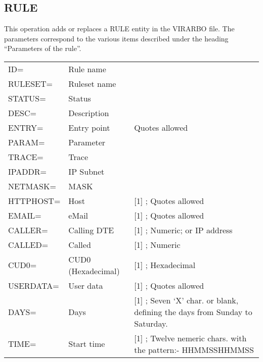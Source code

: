 \documentclass[letterpaper,10pt,english]{sphinxmanual}
\begin{document}

\subsection{RULE}
\label{\detokenize{Installation_Guide:index-169}}\label{\detokenize{Installation_Guide:rule}}
This operation adds or replaces a RULE entity in the VIRARBO file. The parameters correspond to the various items described under the heading “Parameters of the rule”.


\begin{savenotes}\sphinxattablestart
\centering
\begin{tabulary}{\linewidth}[t]{|T|T|T|}
\hline
{}\relax &\relax &\relax \\
\hline
ID=
&
Rule name
&\\
\hline
RULESET=
&
Ruleset name
&\\
\hline
STATUS=
&
Status
&\\
\hline
DESC=
&
Description
&\\
\hline
ENTRY=
&
Entry point
&
Quotes allowed
\\
\hline
PARAM=
&
Parameter
&\\
\hline
TRACE=
&
Trace
&\\
\hline
IPADDR=
&
IP Subnet
&\\
\hline
NETMASK=
&
MASK
&\\
\hline
HTTPHOST=
&
Host
&
{[}1{]} ; Quotes allowed
\\
\hline
EMAIL=
&
eMail
&
{[}1{]} ; Quotes allowed
\\
\hline
CALLER=
&
Calling DTE
&
{[}1{]} ; Numeric; or IP address
\\
\hline
CALLED=
&
Called
&
{[}1{]} ; Numeric
\\
\hline
CUD0=
&
CUD0 (Hexadecimal)
&
{[}1{]} ; Hexadecimal
\\
\hline
USERDATA=
&
User data
&
{[}1{]} ; Quotes allowed
\\
\hline
DAYS=
&
Days
&
{[}1{]} ; Seven ‘X’ char. or blank, defining the days
from Sunday to Saturday.
\\
\hline
TIME=
&
Start time
&
{[}1{]} ; Twelve nemeric chars. with the pattern:-
HHMMSSHHMMSS
\\
\hline
\end{tabulary}
\par
\sphinxattableend\end{savenotes}
\end{document}
